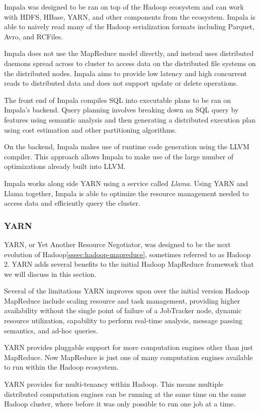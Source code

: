 \documentclass[]{article}
\begin{document}
Impala was designed to be ran on top of the Hadoop ecosystem and can work with HDFS, HBase, YARN, and other components from the ecosystem. Impala is able to naively read many of the Hadoop serialization formats including Parquet, Avro, and RCFiles.

Impala does not use the MapReduce model directly, and instead uses distributed daemons spread across to cluster to access data on the distributed file systems on the distributed nodes. Impala aims to provide low latency and high concurrent reads to distributed data and does not support update or delete operations. 

The front end of Impala compiles SQL into executable plans to be ran on Impala's backend. Query planning involves breaking down an SQL query by features using semantic analysis and then generating a distributed execution plan using cost estimation and other partitioning algorithms.

On the backend, Impala makes use of runtime code generation using the LLVM compiler. This approach allows Impala to make use of the large number of optimizations already built into LLVM.

Impala works along side YARN using a service called \textit{Llama}. Using YARN and Llama together, Impala is able to optimize the resource management needed to access data and efficiently query the cluster.

\subsubsection{YARN}\label{sssec:yarn}
YARN, or Yet Another Resource Negotiator\cite{vavilapalli2013apache}, was designed to be the next evolution of Hadoop\ref{sssec:hadoop-mapreduce}, sometimes referred to as Hadoop 2. YARN adds several benefits to the initial Hadoop MapReduce framework that we will discuss in this section.

Several of the limitations YARN improves upon over the initial version Hadoop MapReduce include scaling resource and task management, providing higher availability without the single point of failure of a JobTracker node, dynamic resource utilization, capability to perform real-time analysis, message passing semantics, and ad-hoc queries.

YARN provides pluggable support for more computation engines other than just MapReduce. Now MapReduce is just one of many computation engines available to run within the Hadoop ecosystem.

YARN provides for multi-tenancy within Hadoop. This means multiple distributed computation engines can be running at the same time on the same Hadoop cluster, where before it was only possible to run one job at a time.
\end{document}
